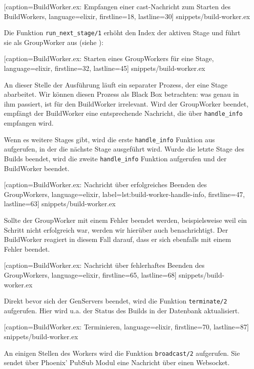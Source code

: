 
  [caption={BuildWorker.ex: Empfangen einer cast-Nachricht zum Starten des BuildWorkers},
  language=elixir,
  firstline=18,
  lastline=30]
  {snippets/build-worker.ex}

Die Funktion \texttt{run\_\allowbreak next\_\allowbreak stage/1} erhöht den Index der aktiven Stage und führt sie als GroupWorker aus (siehe ):


  [caption={BuildWorker.ex: Starten eines GroupWorkers für eine Stage},
  language=elixir,
  firstline=32,
  lastline=45]
  {snippets/build-worker.ex}

An dieser Stelle der Ausführung läuft ein separater Prozess, der eine Stage abarbeitet. Wir können diesen Prozess als Black Box betrachten: was genau in ihm passiert, ist für den BuildWorker irrelevant. Wird der GroupWorker beendet, empfängt der BuildWorker eine entsprechende Nachricht, die über \texttt{handle\_\allowbreak info} empfangen wird.

Wenn es weitere Stages gibt, wird die erste \texttt{handle\_\allowbreak info} Funktion aus  aufgerufen, in der die nächste Stage ausgeführt wird. Wurde die letzte Stage des Builds beendet, wird die zweite \texttt{handle\_\allowbreak info} Funktion aufgerufen und der BuildWorker beendet.


  [caption={BuildWorker.ex: Nachricht über erfolgreiches Beenden des GroupWorkers},
  language=elixir,
  label={lst:build-worker-handle-info},
  firstline=47,
  lastline=63]
  {snippets/build-worker.ex}

Sollte der GroupWorker mit einem Fehler beendet werden, beispielsweise weil ein Schritt nicht erfolgreich war, werden wir hierüber auch benachrichtigt. Der BuildWorker reagiert in diesem Fall darauf, dass er sich ebenfalls mit einem Fehler beendet.


  [caption={BuildWorker.ex: Nachricht über fehlerhaftes Beenden des GroupWorkers},
  language=elixir,
  firstline=65,
  lastline=68]
  {snippets/build-worker.ex}

Direkt bevor sich der GenServers beendet, wird die Funktion \texttt{terminate/2} aufgerufen. Hier wird u.a. der Status des Builds in der Datenbank aktualisiert.


  [caption={BuildWorker.ex: Terminieren},
  language=elixir,
  firstline=70,
  lastline=87]
  {snippets/build-worker.ex}

An einigen Stellen des Workers wird die Funktion \texttt{broadcast/2} aufgerufen. Sie sendet über Phoenix' PubSub Modul eine Nachricht über einen Websocket.


